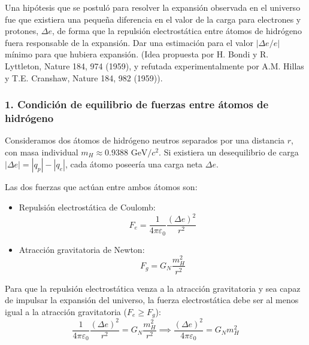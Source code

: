 \newpage
\begin{problema}
Una hipótesis que se postuló para resolver la expansión observada en el universo fue que existiera una pequeña diferencia en el valor de la carga para electrones y protones, $\Delta e$, de forma que la repulsión electrostática entre átomos de hidrógeno fuera responsable de la expansión. Dar una estimación para el valor $|\Delta e/e|$ mínimo para que hubiera expansión. (Idea propuesta por H. Bondi y R. Lyttleton, Nature 184, 974 (1959), y refutada experimentalmente por A.M. Hillas y T.E. Cranshaw, Nature 184, 982 (1959)).

\tcblower

\subsubsection*{1. Condición de equilibrio de fuerzas entre átomos de hidrógeno}

Consideramos dos átomos de hidrógeno neutros separados por una distancia $r$, con masa individual $m_H \approx 0.9388 \text{ GeV}/c^2$. Si existiera un desequilibrio de carga $|\Delta e| = |q_p| - |q_e|$, cada átomo poseería una carga neta $\Delta e$.

Las dos fuerzas que actúan entre ambos átomos son:
\begin{itemize}
    \item Repulsión electrostática de Coulomb:
    \begin{equation*}
    F_e = \frac{1}{4\pi\varepsilon_0} \frac{(\Delta e)^2}{r^2}
    \end{equation*}
    
    \item Atracción gravitatoria de Newton:
    \begin{equation*}
    F_g = G_N \frac{m_H^2}{r^2}
    \end{equation*}
\end{itemize}

Para que la repulsión electrostática venza a la atracción gravitatoria y sea capaz de impulsar la expansión del universo, la fuerza electrostática debe ser al menos igual a la atracción gravitatoria ($F_e \ge F_g$):
\begin{equation*}
\frac{1}{4\pi\varepsilon_0} \frac{(\Delta e)^2}{r^2} = G_N \frac{m_H^2}{r^2} \implies \frac{(\Delta e)^2}{4\pi\varepsilon_0} = G_N m_H^2
\end{equation*}


\end{problema}
